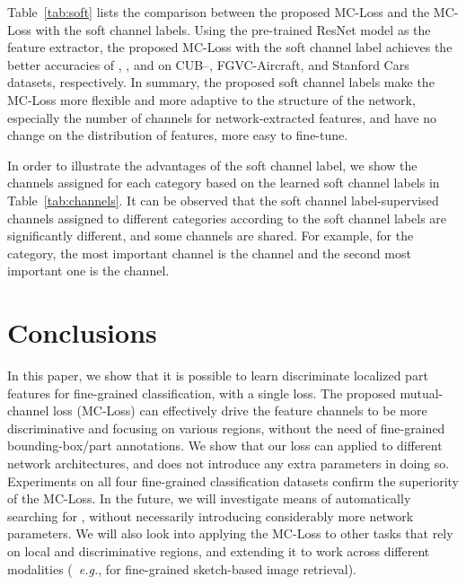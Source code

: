 \documentclass[journal]{IEEEtran}
\begin{document}
Table~\ref{tab:soft} lists the comparison between the proposed MC-Loss and the MC-Loss with the soft channel labels. Using the pre-trained ResNet model as the feature extractor, the proposed MC-Loss with the soft channel label achieves the better accuracies of , , and  on CUB--, FGVC-Aircraft, and Stanford Cars datasets, respectively. In summary, the proposed soft channel labels make the MC-Loss more  flexible and more adaptive to the structure of the network, especially the number of channels for network-extracted features, and have no change on the distribution of features, more easy to fine-tune.


In order to illustrate the advantages of the soft channel label, we show  the channels assigned  for each category based on the learned soft channel labels in Table~\ref{tab:channels}. It can be observed that the soft channel label-supervised channels assigned  to different categories according to the soft channel labels are significantly different, and some channels are shared. 
For example, for the  category, the most important channel is the  channel and the second most important one is the  channel.






















\section{Conclusions}\label{Conclusions}

In this paper, we show that it is possible to learn discriminate localized part features for fine-grained classification, with a single loss. The proposed mutual-channel loss (MC-Loss) can effectively drive the feature channels to be more discriminative and focusing on various regions, without the need of fine-grained bounding-box/part annotations. We show that our loss can applied to different network architectures, and does not introduce any extra parameters in doing so. Experiments on all four fine-grained classification datasets confirm the superiority of the MC-Loss. In the future, we will investigate means of automatically searching for , without necessarily introducing considerably more network parameters. We will also look into applying the MC-Loss to other tasks that rely on local and discriminative regions, and extending it to work across different modalities (~\emph{e.g.}, for fine-grained sketch-based image retrieval).




















\ifCLASSOPTIONcaptionsoff
  \newpage
\fi









{\small


}
\end{document}
